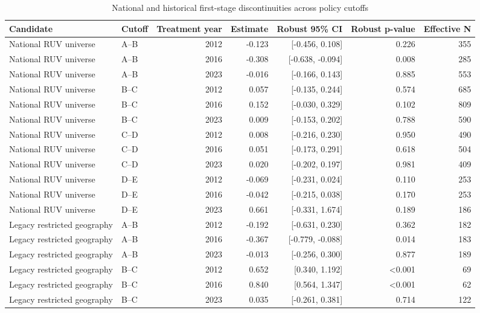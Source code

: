 \begin{table}[!htbp]
\centering
\caption{National and historical first-stage discontinuities across policy cutoffs}
\label{tab:rd_design_named_first_stages}
\begin{tabular}{llrrrrr}
\toprule
Candidate & Cutoff & Treatment year & Estimate & Robust 95\% CI & Robust p-value & Effective N \\
\midrule
National RUV universe & A--B & 2012 & -0.123 & [-0.456, 0.108] & 0.226 & 355 \\
National RUV universe & A--B & 2016 & -0.308 & [-0.638, -0.094] & 0.008 & 285 \\
National RUV universe & A--B & 2023 & -0.016 & [-0.166, 0.143] & 0.885 & 553 \\
National RUV universe & B--C & 2012 & 0.057 & [-0.135, 0.244] & 0.574 & 685 \\
National RUV universe & B--C & 2016 & 0.152 & [-0.030, 0.329] & 0.102 & 809 \\
National RUV universe & B--C & 2023 & 0.009 & [-0.153, 0.202] & 0.788 & 590 \\
National RUV universe & C--D & 2012 & 0.008 & [-0.216, 0.230] & 0.950 & 490 \\
National RUV universe & C--D & 2016 & 0.051 & [-0.173, 0.291] & 0.618 & 504 \\
National RUV universe & C--D & 2023 & 0.020 & [-0.202, 0.197] & 0.981 & 409 \\
National RUV universe & D--E & 2012 & -0.069 & [-0.231, 0.024] & 0.110 & 253 \\
National RUV universe & D--E & 2016 & -0.042 & [-0.215, 0.038] & 0.170 & 253 \\
National RUV universe & D--E & 2023 & 0.661 & [-0.331, 1.674] & 0.189 & 186 \\
Legacy restricted geography & A--B & 2012 & -0.192 & [-0.631, 0.230] & 0.362 & 182 \\
Legacy restricted geography & A--B & 2016 & -0.367 & [-0.779, -0.088] & 0.014 & 183 \\
Legacy restricted geography & A--B & 2023 & -0.013 & [-0.256, 0.300] & 0.877 & 189 \\
Legacy restricted geography & B--C & 2012 & 0.652 & [0.340, 1.192] & \textless{}0.001 & 69 \\
Legacy restricted geography & B--C & 2016 & 0.840 & [0.564, 1.347] & \textless{}0.001 & 62 \\
Legacy restricted geography & B--C & 2023 & 0.035 & [-0.261, 0.381] & 0.714 & 122 \\

\end{tabular}
\end{table}
